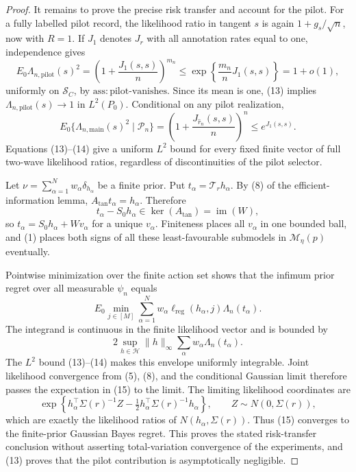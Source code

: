 \documentclass{article}
\begin{document}
\begin{proof}
It remains to prove the precise risk transfer and account for the pilot.  For a fully labelled pilot record, the likelihood ratio in tangent \(s\) is again \(1+g_s/\sqrt n\), now with \(R=1\).  If \(J_1\) denotes \(J_r\) with all annotation rates equal to one, independence gives
\[
 E_0\Lambda_{n,\mathrm{pilot}}(s)^2
 =\left(1+\frac{J_1(s,s)}n\right)^{m_n}
 \leq\exp\left\{\frac{m_n}{n}J_1(s,s)\right\}=1+o(1),             \tag{13}
\]
uniformly on \(\mathcal S_C\), by \(\mathrm{ass:pilot\text{-}vanishes}\).  Since its mean is one, (13) implies \(\Lambda_{n,\mathrm{pilot}}(s)\to1\) in \(L^2(P_0)\).  Conditional on any pilot realization,
\[
 E_0\{\Lambda_{n,\mathrm{main}}(s)^2\mid\mathscr P_n\}
 =\left(1+\frac{J_{\widehat r_n}(s,s)}n\right)^n
 \leq e^{J_1(s,s)}.                                                  \tag{14}
\]
Equations (13)--(14) give a uniform \(L^2\) bound for every fixed finite vector of full two-wave likelihood ratios, regardless of discontinuities of the pilot selector.

Let \(\nu=\sum_{\alpha=1}^Nw_\alpha\delta_{h_\alpha}\) be a finite prior.  Put \(t_\alpha=\mathcal T_rh_\alpha\).  By (8) of the efficient-information lemma, \(A_{\mathrm{tan}}t_\alpha=h_\alpha\).  Therefore
\[
 t_\alpha-S_0h_\alpha\in\ker(A_{\mathrm{tan}})=\operatorname{im}(W),
\]
so \(t_\alpha=S_0h_\alpha+Wv_\alpha\) for a unique \(v_\alpha\).  Finiteness places all \(v_\alpha\) in one bounded ball, and (1) places both signs of all these least-favourable submodels in \(\mathcal M_\eta(p)\) eventually.

Pointwise minimization over the finite action set shows that the infimum prior regret over all measurable \(\psi_n\) equals
\[
 E_0\min_{j\in[M]}\sum_{\alpha=1}^N
 w_\alpha\ell_{\mathrm{reg}}(h_\alpha,j)\Lambda_n(t_\alpha).        \tag{15}
\]
The integrand is continuous in the finite likelihood vector and is bounded by
\[
 2\sup_{h\in\mathcal H}\lVert h\rVert_\infty
 \sum_\alpha w_\alpha\Lambda_n(t_\alpha).
\]
The \(L^2\) bound (13)--(14) makes this envelope uniformly integrable.  Joint likelihood convergence from (5), (8), and the conditional Gaussian limit therefore passes the expectation in (15) to the limit.  The limiting likelihood coordinates are
\[
 \exp\left\{h_\alpha^\top\Sigma(r)^{-1}Z
 -\tfrac12h_\alpha^\top\Sigma(r)^{-1}h_\alpha\right\},\qquad
 Z\sim N(0,\Sigma(r)),                                               \tag{16}
\]
which are exactly the likelihood ratios of \(N(h_\alpha,\Sigma(r))\).  Thus (15) converges to the finite-prior Gaussian Bayes regret.  This proves the stated risk-transfer conclusion without asserting total-variation convergence of the experiments, and (13) proves that the pilot contribution is asymptotically negligible.
\end{proof}
\end{document}

